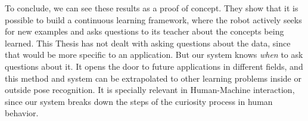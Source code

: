 To conclude, we can see these results as a proof of concept. They show that it is possible to build a continuous learning framework, where the robot actively seeks for new examples and asks questions to its teacher about the concepts being learned. This Thesis has not dealt with asking questions about the data, since that would be more specific to an application. But our system knows \emph{when} to ask questions about it. It opens the door to future applications in different fields, and this method and system can be extrapolated to other learning problems inside or outside pose recognition. It is specially relevant in Human-Machine interaction, since our system breaks down the steps of the curiosity process in human behavior.   



